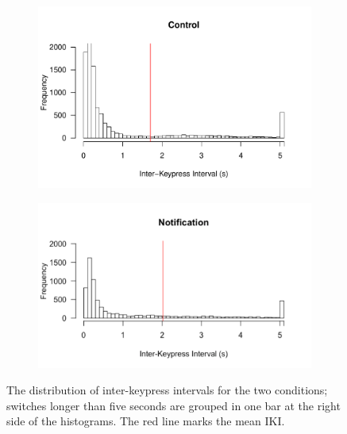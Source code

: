 \begin{figure}
\centering
\begin{subfigure}{0.5\textwidth}
\centerline{\includegraphics[scale=0.6]{images/ch56/ch56-histIKIs_Control.pdf}}
\end{subfigure}
\begin{subfigure}{0.5\textwidth}
\centerline{\includegraphics[scale=0.5]{images/ch56/ch56-histIKIs_Not.pdf}}
\end{subfigure}
\caption{The distribution of inter-keypress intervals for the two conditions; switches longer than five seconds are grouped in one bar at the right side of the histograms. The red line marks the mean IKI.}
\label{fig:ch56-histikis}
\end{figure}

